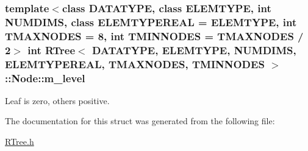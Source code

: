 \hypertarget{structRTree_1_1Node_a894162b955540567f0519bbbc33a6bf5}{
\subsubsection[{m\-\_\-level}]{\setlength{\rightskip}{0pt plus 5cm}template$<$class D\-A\-T\-A\-T\-Y\-P\-E, class E\-L\-E\-M\-T\-Y\-P\-E, int N\-U\-M\-D\-I\-M\-S, class E\-L\-E\-M\-T\-Y\-P\-E\-R\-E\-A\-L = E\-L\-E\-M\-T\-Y\-P\-E, int T\-M\-A\-X\-N\-O\-D\-E\-S = 8, int T\-M\-I\-N\-N\-O\-D\-E\-S = T\-M\-A\-X\-N\-O\-D\-E\-S / 2$>$ int {\bf R\-Tree}$<$ D\-A\-T\-A\-T\-Y\-P\-E, E\-L\-E\-M\-T\-Y\-P\-E, N\-U\-M\-D\-I\-M\-S, E\-L\-E\-M\-T\-Y\-P\-E\-R\-E\-A\-L, T\-M\-A\-X\-N\-O\-D\-E\-S, T\-M\-I\-N\-N\-O\-D\-E\-S $>$\-::Node\-::m\-\_\-level}}\label{structRTree_1_1Node_a894162b955540567f0519bbbc33a6bf5}


Leaf is zero, others positive. 



The documentation for this struct was generated from the following file\-:\begin{DoxyCompactItemize}
\item 
\hyperlink{RTree_8h}{R\-Tree.\-h}\end{DoxyCompactItemize}
